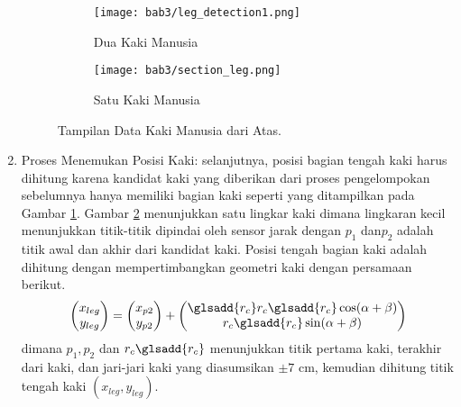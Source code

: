 \begin{enumerate}
        \begin{figure}[H]
            \centering
            \begin{subfigure}[b]{.30\textwidth}\texttt{[image: bab3/leg\_detection1.png]}\caption{Dua Kaki Manusia}\label{Fig:Ch02_leg1}\end{subfigure}
            \begin{subfigure}[b]{.30\textwidth}\texttt{[image: bab3/section\_leg.png]}\caption{Satu Kaki Manusia}\label{Fig:Ch02_leg2}\end{subfigure}
            \caption{Tampilan Data Kaki Manusia dari Atas\cite{c1b}.}
            \label{Fig:ch02_posisi_leg}
        \end{figure}
        \item Proses Menemukan Posisi Kaki: selanjutnya, posisi bagian tengah kaki harus dihitung karena kandidat kaki yang diberikan dari proses pengelompokan sebelumnya hanya memiliki bagian kaki seperti yang ditampilkan pada Gambar \ref{Fig:Ch02_leg1}. 
        Gambar \ref{Fig:Ch02_leg2} menunjukkan satu lingkar kaki dimana lingkaran kecil menunjukkan titik-titik dipindai oleh sensor jarak dengan $p_1$ dan$p_2$ adalah titik awal dan akhir dari kandidat kaki. 
        Posisi tengah bagian kaki adalah dihitung dengan mempertimbangkan geometri kaki dengan persamaan berikut.
        \begin{equation}
            \begin{pmatrix}
                x_{leg}\\
                y_{leg}
            \end{pmatrix} =
            \begin{pmatrix}
                x_{p2}\\
                y_{p2}
            \end{pmatrix} +
            \begin{pmatrix}
                \glsadd{r_c}
                r_c\glsadd{r_c} \cos (\alpha + \beta)\\
                r_c\glsadd{r_c} \sin (\alpha + \beta)
            \end{pmatrix}
        \end{equation}
        dimana $p_1, p_2 $ dan $r_c\glsadd{r_c}$ menunjukkan titik pertama kaki, terakhir dari kaki, dan jari-jari kaki yang diasumsikan $\pm 7$ cm, kemudian dihitung titik tengah kaki $(x_{leg},y_{leg})$.


\end{enumerate}
